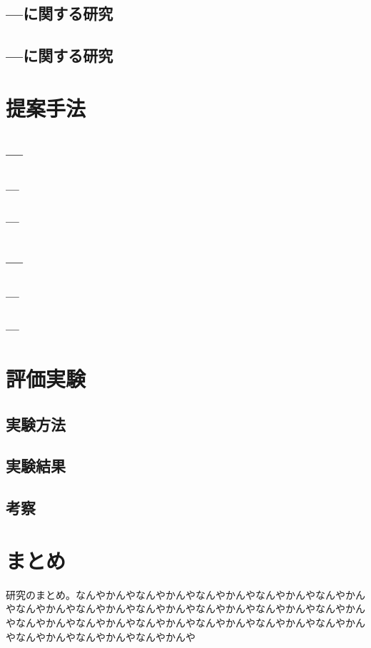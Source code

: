 \documentclass[12pt,a4j]{jreport}
\begin{document}
\section{---に関する研究}
\section{---に関する研究}

\chapter{提案手法}
\section{---}
\subsection{---}
\subsection{---}
\section{---}
\subsection{---}
\subsection{---}

\chapter{評価実験}
\section{実験方法}
\section{実験結果}
\section{考察}

\chapter{まとめ}
研究のまとめ。なんやかんやなんやかんやなんやかんやなんやかんやなんやかんやなんやかんやなんやかんやなんやかんやなんやかんやなんやかんやなんやかんやなんやかんやなんやかんやなんやかんやなんやかんやなんやかんやなんやかんやなんやかんやなんやかんやなんやかんや
\end{document}

